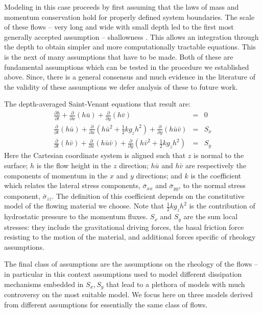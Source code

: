 \documentclass{article}
\begin{document}
Modeling in this case proceeds by first assuming that the laws of mass and momentum conservation hold for properly defined system boundaries. The scale of these flows -- very long and wide with small depth led to the first most generally accepted assumption -- shallowness \citep{SavageHutter1989}. This allows an integration through the depth to obtain simpler and more computationally tractable equations. This is the next of many assumptions that have to be made. Both of these are fundamental assumptions which can be tested in the procedure we established above. Since, there is a general consensus and much evidence in the literature of the validity of these assumptions we defer analysis of these to future work.

The depth-averaged Saint-Venant equations that result are:
\begin{eqnarray}
\label{eq:D_A}
\frac{\partial h}{\partial t} +
\frac{\partial}{\partial x}(h \bar{u}) +
\frac{\partial}{\partial y}(h\bar{v}) &=& 0 \nonumber \\
\frac{\partial}{\partial t} (h\bar{u}) +
\frac{\partial}{\partial x}\left(h\bar{u}^2 + \frac{1}{2}k g_{z}h^2\right) + \frac{\partial}{\partial y}(h\bar{u}\bar{v}) &=& S_{x}\\
\frac{\partial}{\partial t} (h\bar{v}) +
\frac{\partial}{\partial x}(h\bar{u}\bar{v}) +
\frac{\partial}{\partial y}\left(h\bar{v}^2 + \frac{1}{2}k g_{z}h^2\right) &=& S_{y} \nonumber
\end{eqnarray}
Here the Cartesian coordinate system is aligned such that $z$ is normal to the surface; $h$ is the flow height in the $z$ direction; $h\bar{u}$ and $h\bar{v}$ are respectively the components of momentum in the $x$ and $y$ directions; and $k$ is the coefficient which relates the lateral stress components, $\bar{\sigma}_{xx}$ and $\bar{\sigma}_{yy}$, to the normal stress component, $\bar{\sigma}_{zz}$. The definition of this coefficient depends on the constitutive model of the flowing material we choose. Note that $\frac{1}{2} k g_z h^2$ is the contribution of hydrostatic pressure to the momentum fluxes. $S_x$ and $S_y$ are the sum local stresses: they include the gravitational driving forces, the basal friction force resisting to the motion of the material, and additional forces specific of rheology assumptions.

The final class of assumptions are the assumptions on the rheology of the flows -- in particular in this context assumptions used to model different dissipation mechanisms embedded in $S_x, S_y$ that lead to a plethora of models with much controversy on the most suitable model. We focus here on three models derived from different assumptions for essentially the same class of flows.
\end{document}
